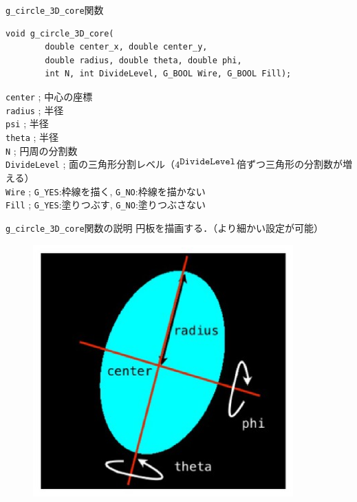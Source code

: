 \documentclass[platex,a4paper,12pt]{jsarticle}%
\begin{document}
\begin{itembox}[l]{\texttt{g\_circle\_3D\_core}関数}
\begin{verbatim}
void g_circle_3D_core(
        double center_x, double center_y,
        double radius, double theta, double phi,        
        int N, int DivideLevel, G_BOOL Wire, G_BOOL Fill);
\end{verbatim}
\verb|center| ; 中心の座標\\
\verb|radius| ; 半径\\
\verb|psi| ; 半径\\
\verb|theta| ; 半径\\
\verb|N| ; 円周の分割数 \\
\verb|DivideLevel| ; 面の三角形分割レベル（$4^{\verb|DivideLevel|}$倍ずつ三角形の分割数が増える）\\
\verb|Wire| ; \verb|G_YES|:枠線を描く, \verb|G_NO|:枠線を描かない \\
\verb|Fill| ; \verb|G_YES|:塗りつぶす, \verb|G_NO|:塗りつぶさない 
\end{itembox}

\begin{itembox}[l]{\texttt{g\_circle\_3D\_core}関数の説明}
円板を描画する．（より細かい設定が可能）
\end{itembox}
\begin{figure}[htb]
\centering
	\includegraphics[width=100mm]{./Figures/eps/Canvas_g_circle.eps}
\end{figure}
\end{document}
